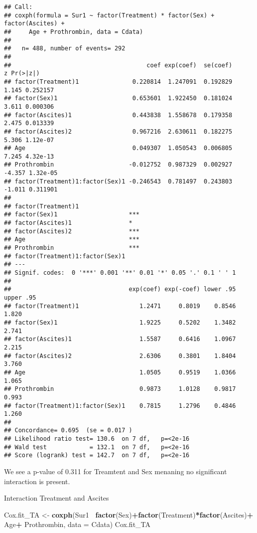 \documentclass[
]{article}
\newenvironment{Shaded}{\begin{snugshade}}{\end{snugshade}}
\newcommand{\DataTypeTok}[1]{\textcolor[rgb]{0.13,0.29,0.53}{#1}}
\newcommand{\KeywordTok}[1]{\textcolor[rgb]{0.13,0.29,0.53}{\textbf{#1}}}
\newcommand{\NormalTok}[1]{#1}
\newcommand{\OperatorTok}[1]{\textcolor[rgb]{0.81,0.36,0.00}{\textbf{#1}}}
\newcommand{\StringTok}[1]{\textcolor[rgb]{0.31,0.60,0.02}{#1}}
\begin{document}
\begin{verbatim}
## Call:
## coxph(formula = Sur1 ~ factor(Treatment) * factor(Sex) + factor(Ascites) + 
##     Age + Prothrombin, data = Cdata)
## 
##   n= 488, number of events= 292 
## 
##                                      coef exp(coef)  se(coef)      z Pr(>|z|)
## factor(Treatment)1               0.220814  1.247091  0.192829  1.145 0.252157
## factor(Sex)1                     0.653601  1.922450  0.181024  3.611 0.000306
## factor(Ascites)1                 0.443838  1.558678  0.179358  2.475 0.013339
## factor(Ascites)2                 0.967216  2.630611  0.182275  5.306 1.12e-07
## Age                              0.049307  1.050543  0.006805  7.245 4.32e-13
## Prothrombin                     -0.012752  0.987329  0.002927 -4.357 1.32e-05
## factor(Treatment)1:factor(Sex)1 -0.246543  0.781497  0.243803 -1.011 0.311901
##                                    
## factor(Treatment)1                 
## factor(Sex)1                    ***
## factor(Ascites)1                *  
## factor(Ascites)2                ***
## Age                             ***
## Prothrombin                     ***
## factor(Treatment)1:factor(Sex)1    
## ---
## Signif. codes:  0 '***' 0.001 '**' 0.01 '*' 0.05 '.' 0.1 ' ' 1
## 
##                                 exp(coef) exp(-coef) lower .95 upper .95
## factor(Treatment)1                 1.2471     0.8019    0.8546     1.820
## factor(Sex)1                       1.9225     0.5202    1.3482     2.741
## factor(Ascites)1                   1.5587     0.6416    1.0967     2.215
## factor(Ascites)2                   2.6306     0.3801    1.8404     3.760
## Age                                1.0505     0.9519    1.0366     1.065
## Prothrombin                        0.9873     1.0128    0.9817     0.993
## factor(Treatment)1:factor(Sex)1    0.7815     1.2796    0.4846     1.260
## 
## Concordance= 0.695  (se = 0.017 )
## Likelihood ratio test= 130.6  on 7 df,   p=<2e-16
## Wald test            = 132.1  on 7 df,   p=<2e-16
## Score (logrank) test = 142.7  on 7 df,   p=<2e-16
\end{verbatim}

We see a p-value of 0.311 for Treamtent and Sex menaning no significant
interaction is present.

Interaction Treatment and Ascites

\begin{Shaded}
\begin{Highlighting}[]
\NormalTok{Cox.fit_TA <-}\StringTok{ }\KeywordTok{coxph}\NormalTok{(Sur1}\OperatorTok{~}\StringTok{ }\KeywordTok{factor}\NormalTok{(Sex)}\OperatorTok{+}\KeywordTok{factor}\NormalTok{(Treatment)}\OperatorTok{*}\KeywordTok{factor}\NormalTok{(Ascites)}\OperatorTok{+}\StringTok{ }\NormalTok{Age}\OperatorTok{+}\StringTok{ }\NormalTok{Prothrombin, }\DataTypeTok{data =}\NormalTok{ Cdata)}
\NormalTok{Cox.fit_TA}
\end{Highlighting}
\end{Shaded}
\end{document}
